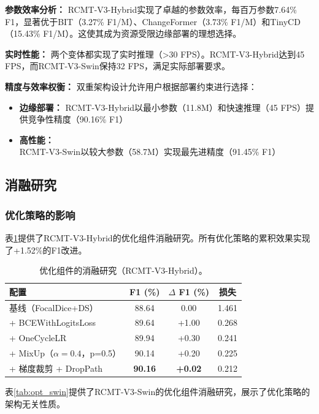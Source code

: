 \documentclass[journal]{IEEEtran}
\begin{document}
\textbf{参数效率分析：} RCMT-V3-Hybrid实现了卓越的参数效率，每百万参数7.64\% F1，显著优于BIT（3.27\% F1/M）、ChangeFormer（3.73\% F1/M）和TinyCD（15.43\% F1/M）。这使其成为资源受限边缘部署的理想选择。

\textbf{实时性能：} 两个变体都实现了实时推理（>30 FPS）。RCMT-V3-Hybrid达到45 FPS，而RCMT-V3-Swin保持32 FPS，满足实际部署要求。

\textbf{精度与效率权衡：} 双重架构设计允许用户根据部署约束进行选择：
\begin{itemize}
\item \textbf{边缘部署：} RCMT-V3-Hybrid以最小参数（11.8M）和快速推理（45 FPS）提供竞争性精度（90.16\% F1）
\item \textbf{高性能：} RCMT-V3-Swin以较大参数（58.7M）实现最先进精度（91.45\% F1）
\end{itemize}

\subsection{消融研究}

\subsubsection{优化策略的影响}

表\ref{tab:opt_hybrid}提供了RCMT-V3-Hybrid的优化组件消融研究。所有优化策略的累积效果实现了+1.52\%的F1改进。

\begin{table}[ht]
\centering
\caption{优化组件的消融研究（RCMT-V3-Hybrid）。}
\label{tab:opt_hybrid}
\begin{tabular}{lccc}
\toprule
\textbf{配置} & \textbf{F1 (\%)} & \textbf{$\Delta$ F1 (\%)} & \textbf{损失} \\
\midrule
    基线（FocalDice+DS） & 88.64 & 0.00 & 1.461 \\
    + BCEWithLogitsLoss & 89.64 & +1.00 & 0.268 \\
    + OneCycleLR & 89.94 & +0.30 & 0.241 \\
    + MixUp（$\alpha=0.4$，p=0.5） & 90.14 & +0.20 & 0.225 \\
    + 梯度裁剪 + DropPath & \textbf{90.16} & \textbf{+0.02} & 0.212 \\
\bottomrule
\end{tabular}
\end{table}

表\ref{tab:opt_swin}提供了RCMT-V3-Swin的优化组件消融研究，展示了优化策略的架构无关性质。
\end{document}
